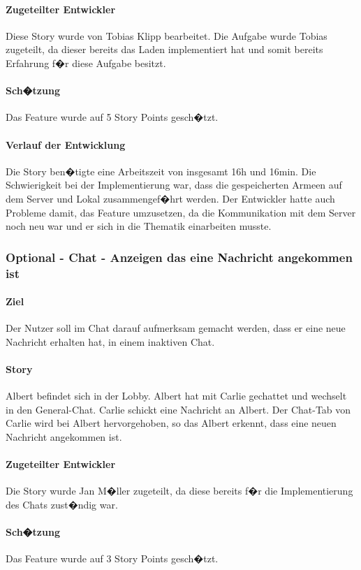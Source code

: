 \documentclass[12pt, titlepage]{scrartcl}
\begin{document}
			\paragraph{Zugeteilter Entwickler} Diese Story wurde von Tobias Klipp bearbeitet. Die Aufgabe wurde Tobias zugeteilt, da dieser bereits das Laden implementiert hat und somit bereits Erfahrung f�r diese Aufgabe besitzt.
			\paragraph{Sch�tzung}
			Das Feature wurde auf 5 Story Points gesch�tzt.
			\paragraph{Verlauf der Entwicklung} 
			Die Story ben�tigte eine Arbeitszeit von insgesamt 16h und 16min. Die Schwierigkeit bei der Implementierung war, dass die gespeicherten Armeen auf dem Server und Lokal zusammengef�hrt werden. Der Entwickler hatte auch Probleme damit, das Feature umzusetzen, da die Kommunikation mit dem Server noch neu war und er sich in die Thematik einarbeiten musste.
			\subsubsection{Optional - Chat - Anzeigen das eine Nachricht angekommen ist}
			\paragraph{Ziel} Der Nutzer soll im Chat darauf aufmerksam gemacht werden, dass er eine neue Nachricht erhalten hat, in einem inaktiven Chat.
			\paragraph{Story}Albert befindet sich in der Lobby. Albert hat mit Carlie gechattet und wechselt in den General-Chat. Carlie schickt eine Nachricht an Albert. Der Chat-Tab von Carlie wird bei Albert hervorgehoben, so das Albert erkennt, dass eine neuen Nachricht angekommen ist.
			\paragraph{Zugeteilter Entwickler} Die Story wurde Jan M�ller zugeteilt, da diese bereits f�r die Implementierung des Chats zust�ndig war. 
			\paragraph{Sch�tzung}
			Das Feature wurde auf 3 Story Points gesch�tzt.
\end{document}
